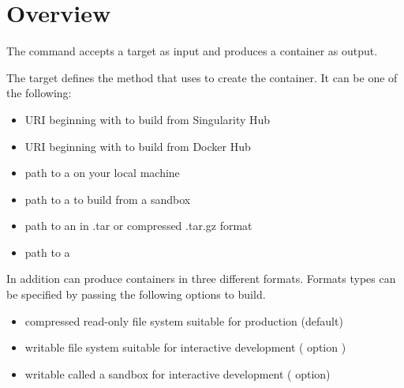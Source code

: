 \documentclass[letterpaper,10pt,english]{sphinxmanual}
\begin{document}
\section{Overview}
\label{\detokenize{build_a_container:overview}}
The  command accepts a target as input and produces a container as output.

The target defines the method that  uses to create the container. It
can be one of the following:
\begin{itemize}
\item {} 
URI beginning with  to build from Singularity Hub

\item {} 
URI beginning with  to build from Docker Hub

\item {} 
path to a  on your local machine

\item {} 
path to a  to build from a sandbox

\item {} 
path to an  in .tar or compressed .tar.gz format

\item {} 
path to a {\hyperref[\detokenize{container_recipes:container-recipes}]{}}

\end{itemize}

In addition  can produce containers in three different formats. Formats
types can be specified by passing the following options to build.
\begin{itemize}
\item {} 
compressed read-only  file system suitable for production
(default)

\item {} 
writable  file system suitable for interactive development ( 
option )

\item {} 
writable  called a sandbox for interactive
development (  option)

\end{itemize}
\end{document}
